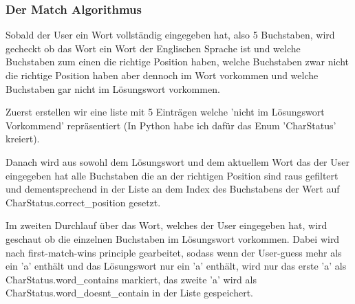 \documentclass[a4paper]{article}
\begin{document}
            \subsubsection{Der Match Algorithmus}
                Sobald der User ein Wort vollständig eingegeben hat, also 5 Buchstaben, wird gecheckt ob das Wort ein Wort der Englischen Sprache ist und welche Buchstaben zum einen die richtige Position haben, welche Buchstaben zwar nicht die richtige Position haben aber dennoch im Wort vorkommen und welche Buchstaben gar nicht im Lösungswort vorkommen.
                
                Zuerst erstellen wir eine liste mit 5 Einträgen welche 'nicht im Lösungswort Vorkommend' repräsentiert (In Python habe ich dafür das Enum 'CharStatus' kreiert).
                
                Danach wird aus sowohl dem Lösungswort und dem aktuellem Wort das der User eingegeben hat alle Buchstaben die an der richtigen Position sind raus gefiltert und dementsprechend in der Liste an dem Index des Buchstabens der Wert auf CharStatus.correct\_position gesetzt.
                
                Im zweiten Durchlauf über das Wort, welches der User eingegeben hat, wird geschaut ob die einzelnen Buchstaben im Lösungswort vorkommen. Dabei wird nach first-match-wins principle gearbeitet, sodass wenn der User-guess mehr als ein 'a' enthält und das Lösungswort nur ein 'a' enthält, wird nur das erste 'a' als CharStatus.word\_contains markiert, das zweite 'a' wird als CharStatus.word\_doesnt\_contain in der Liste gespeichert.
                
\end{document}
